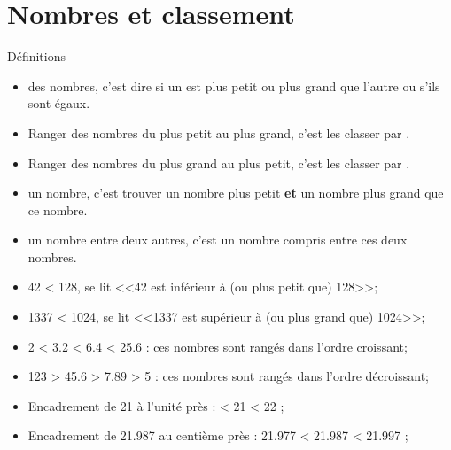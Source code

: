 \documentclass[xcolor={dvipsnames}]{beamer}
\begin{document}
\section{Nombres et classement}


\begin{frame}
	\begin{alertblock}{Définitions}
	
			\begin{itemize}
				\item {} des nombres, c'est dire si un est plus petit ou plus grand que l'autre ou s'ils sont égaux.\pause
				
				\item Ranger des nombres du plus petit au plus grand, c'est les classer par .\pause
				
				\item Ranger des nombres du plus grand au plus petit, c'est les classer par .\pause
				
				\item {} un nombre, c'est trouver un nombre plus petit \textbf{et} un nombre plus grand que ce nombre.\pause
				
				\item {} un nombre entre deux autres, c'est un nombre compris entre ces deux nombres.
			\end{itemize}
			
	\end{alertblock}
\end{frame}

\begin{frame}
	\begin{myexs}
		\begin{itemize}
			\item 42 < 128, se lit \pause <<42 est inférieur à (ou plus petit que) 128>>;\pause
			\item 1337 < 1024, se lit \pause <<\num{1337} est supérieur à (ou plus grand que) \num{1024}>>;\pause
			\item 2 < \num{3.2} < \num{6.4} < \num{25.6} : ces nombres sont rangés dans l'ordre \pause croissant;\pause
			\item 123 > \num{45.6} > \num{7.89} > \num{5} : ces nombres sont rangés dans l'ordre \pause décroissant;\pause
			\item Encadrement de 21 à l'unité près :  < 21 < 22 ;\pause
			\item Encadrement de \num{21.987} au centième près : \pause \num{21.977} < \num{21.987} < \num{21.997} ;\pause
		\end{itemize}
	\end{myexs}
\end{frame}
\end{document}
